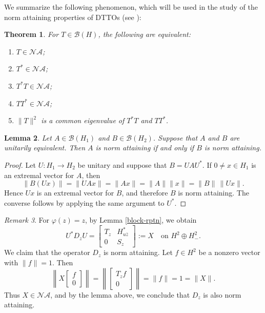 \documentclass[12pt]{amsart}
\newtheorem{theorem}{Theorem}[section]
\newtheorem{lemma}[theorem]{Lemma}
\theoremstyle{definition}
\theoremstyle{remark}
\newtheorem{remark}[theorem]{Remark}
\newcommand{\clb}{\mathcal{B}}
\newcommand{\vp}{\varphi}
\numberwithin{equation}{section}
\begin{document}
We summarize the following phenomenon, which will be used in the study of the norm attaining properties of DTTOs (see \cite[Corollary 2.4; Proposition 2.5]{Carvajal2012}):

\begin{theorem}\label{thm:NA_equiv}
For $T \in \clb(H)$, the following are equivalent:
\begin{enumerate}
\item $T \in \mathcal{NA}$;
\item $T^* \in \mathcal{NA}$;
\item $T^* T \in \mathcal{NA}$;
 \item $TT^* \in \mathcal{NA}$;
\item $\|T\|^2$ is a common eigenvalue of $T^* T$ and $TT^*$.
\end{enumerate}
\end{theorem}

\begin{lemma}
Let $A\in\clb(H_1)$ and $B\in\clb(H_2)$. Suppose that $A$ and $B$
are unitarily equivalent. Then $A$ is norm attaining if and only if $B$ is norm attaining.
\end{lemma}

\begin{proof}
Let $U:H_1\to H_2$ be unitary and suppose that $B=UAU^*$. If $0\neq x\in H_1$ is an extremal vector for $A$, then
\[
\|B(Ux)\|=\|UAx\|=\|Ax\|=\|A\|\|x\|=\|B\|\,\|Ux\|.
\]
Hence $Ux$ is an extremal vector for $B$, and therefore $B$ is norm attaining. The converse follows by applying the same argument to $U^*$.
\end{proof}

\begin{remark}
  For $\vp(z)=z$, by Lemma \ref{block-rptn}, we obtain
\[U^*D_z U =
\begin{bmatrix}
	T_z & H^*_{u\bar{z}}\\
	0   & S_z
\end{bmatrix}:= X \quad \text{on } H^2\oplus H^2_{-}.\]
We claim that the operator $D_z$ is norm attaining. Let $f\in H^2$ be a nonzero vector with $\|f\|=1$. Then
\[\left\|
X\begin{bmatrix}
	f\\[2pt] 0
\end{bmatrix}
\right\|
=
\left\|
\begin{bmatrix}
	T_z f\\[2pt] 0
\end{bmatrix}
\right\|
= \|f\| = 1 = \|X\|.\]
Thus $X\in \mathcal{NA}$, and by the lemma above, we conclude that $D_z$ is also norm attaining. 
\end{remark}
\end{document}
